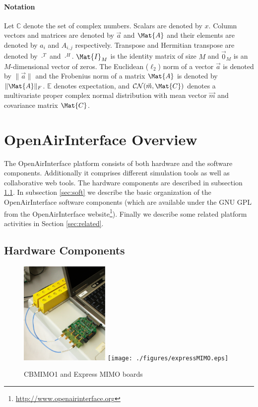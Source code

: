 \documentclass[a4paper,twocolumn,journal]{IEEEtran}
\begin{document}
\paragraph*{Notation}
Let $\mathbb{C}$ denote the set of complex numbers. Scalars are denoted by $x$. Column vectors and matrices are denoted by $\Vec{a}$ and $\Mat{A}$ and their elements are denoted by $a_i$ and $A_{i,j}$ respectively. Transpose and Hermitian transpose are denoted by $\cdot^T$ and $\cdot^H$. $\Mat{I}_M$ is the identity matrix of size $M$ and $\Vec{0}_M$ is an $M$-dimensional vector of zeros. The Euclidean ($\ell_2$) norm of a vector $\Vec{a}$ is denoted by $\|\Vec{a}\|$ and the Frobenius norm of a matrix $\Mat{A}$ is denoted by $\|\Mat{A}\|_F$. $\mathbb{E}$ denotes expectation, and $\mathcal{CN}(\Vec{m},\Mat{C})$ denotes a multivariate proper complex normal distribution with mean vector $\Vec{m}$ and covariance matrix $\Mat{C}$.



\section{OpenAirInterface Overview}
\label{sec:overview}

The OpenAirInterface platform consists of both hardware and the software components. Additionally it comprises different simulation tools as well as collaborative web tools. The hardware components are described in subsection \ref{sec:hard}. In subsection \ref{sec:soft} we describe the basic organization of the OpenAirInterface software components (which are available under the GNU GPL from the OpenAirInterface website\footnote{\url{http://www.openairinterface.org}}). Finally we describe some related platform activities in Section \ref{sec:related}. 

\subsection{Hardware Components}
\label{sec:hard}

\begin{figure}[t]
 \centering
 \includegraphics[height=5cm]{./figures/cbmimo.eps}
 \texttt{[image: ./figures/expressMIMO.eps]}
 \caption{CBMIMO1 and Express MIMO boards}
 \label{fig:hardware}
\end{figure}
\end{document}
